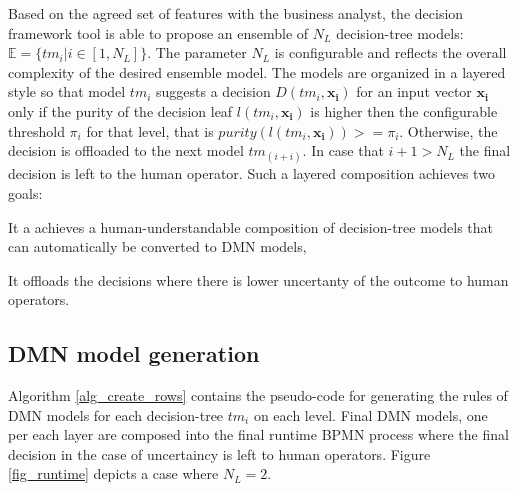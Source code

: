 \documentclass[runningheads]{llncs}
\begin{document}
Based on the agreed set of features with the business analyst, the decision framework tool is able to propose an ensemble of $N_L$ decision-tree models: $\mathbb{E} = \{tm_i | i \in [1,N_L]\}$. The parameter $N_L$ is configurable and reflects the overall complexity of the desired ensemble model. The models are organized in a layered style so that model $tm_i$ suggests a decision $D(tm_i, \mathbf{x_i})$ for an input vector $\mathbf{x_i}$ only if the purity of the decision leaf $l(tm_i, \mathbf{x_i})$ is higher then the configurable threshold $\pi_i$ for that level, that is $purity(l(tm_i, \mathbf{x_i})) >= \pi_i$. Otherwise, the decision is offloaded to the next model $tm_(i+i)$. In case that $i+1 > N_L$ the final decision is left to the human operator. Such a layered composition achieves two goals:
\begin{enumerate*}[label=(\arabic*)]
    \item It a achieves a human-understandable composition of decision-tree models that can automatically be converted to DMN models,
    \item It offloads the decisions where there is lower uncertanty of the outcome to human operators.
\end{enumerate*}

\subsection{DMN model generation}

Algorithm \ref{alg_create_rows} contains the pseudo-code for generating the rules of DMN models for each decision-tree $tm_i$ on each level. Final DMN models, one per each layer are composed into the final runtime BPMN process where the final decision in the case of uncertaincy is left to human operators. Figure \ref{fig_runtime} depicts a case where $N_L = 2$.


\end{document}

